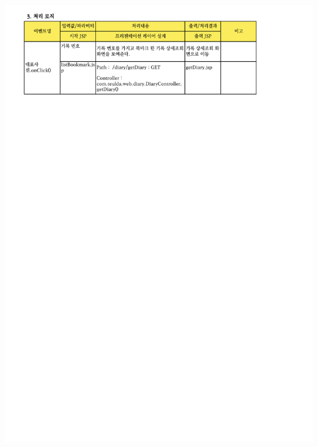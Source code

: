 {{{{{{{{{{{{{{{{{{{{{{{{{{{{{{{{{{{{{{{{{{{{{{{{{{{{{{{{{{{{{{{{{{{{{\includegraphics[width=20cm]{./Figure/Design/Display/post/post_17.pdf} \\
}}}}}}}}}}}}}}}}}}}}}}}}}}}}}}}}}}}}}}}}}}}}}}}}}}}}}}}}}}}}}}}}}}}}}

